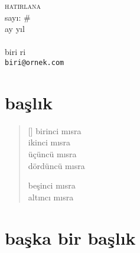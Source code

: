\documentclass[a4paper, twocolumn, openright]{memoir}
\begin{document}
\thispagestyle{plain}
\noindent
{\HUGE\textsc{hatirlana}\\\small{}sayı: \#\\ay yıl}\\\\
{\small{}biri ri\\\texttt{biri@ornek.com}}
\bigskip
\section{başlık}
\lipsum[0-2]
\begin{verse}[\versewidth]
  birinci mısra \\
  ikinci mısra \\
  üçüncü mısra \\
  dördüncü mısra

  beşinci mısra \\
  altıncı mısra
\end{verse}
\section{başka bir başlık}
\lipsum[3-6]
\end{document}
